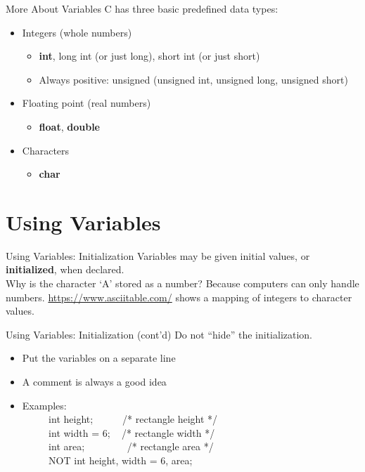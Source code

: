 \documentclass[graphics]{beamer}
\begin{document}
\begin{frame}{More About Variables}
    C has three basic predefined data types:
    \begin{itemize}
        \item Integers (whole numbers)
        \begin{itemize}
            \item \textbf{int}, long int (or just long), short int (or just short)
            \item Always positive: unsigned (unsigned int, unsigned long, unsigned short)
        \end{itemize}
        \item Floating point (real numbers)
        \begin{itemize}
            \item \textbf{float}, \textbf{double}
        \end{itemize}
        \item Characters
        \begin{itemize}
            \item \textbf{char}
        \end{itemize}
    \end{itemize}
\end{frame}

\section*{Using Variables}
\begin{frame}{Using Variables: Initialization}
    Variables may be given initial values, or \textbf{initialized}, when declared. \\
    
    
    Why is the character `A' stored as a number? Because computers can only handle numbers.
    \url{https://www.asciitable.com/} shows a mapping of integers to character values.
\end{frame}

\begin{frame}{Using Variables: Initialization (cont'd)}
    Do not ``hide'' the initialization.
    \begin{itemize}
        \item Put the variables on a separate line
        \item A comment is always a good idea
        \item Examples: \\
        ~~ ~~ int height; ~~ ~~ /* rectangle height */ \\
        ~~ ~~ int width = 6; ~ /* rectangle width */ \\
        ~~ ~~ int area; ~~ ~~ ~~ /* rectangle area */ \\
        ~~ ~~ NOT int height, width = 6, area;
    \end{itemize}
\end{frame}
\end{document}
